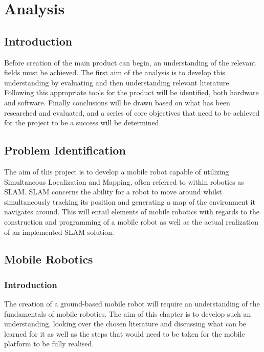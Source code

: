 \part{Analysis}
		\chapter{Introduction}
		Before creation of the main product can begin, an understanding of the relevant fields must be achieved. The first aim of the analysis is to develop this understanding by evaluating and then understanding relevant literature. Following this appropriate tools for the product will be identified, both hardware and software. Finally conclusions will be drawn based on what has been researched and evaluated, and a series of core objectives that need to be achieved for the project to be a success will be determined.

		\chapter{Problem Identification}
		The aim of this project is to develop a mobile robot capable of utilizing Simultaneous Localization and Mapping, often referred to within robotics as SLAM. SLAM concerns the ability for a robot to move around whilst simultaneously tracking its position and generating a map of the environment it navigates around. This will entail elements of mobile robotics with regards to the construction and programming of a mobile robot as well as the actual realization of an implemented SLAM solution.
		
		
		
		
		\chapter{Mobile Robotics}
		\label{litreview:mobilerobotics}
			\section{Introduction}
			The creation of a ground-based mobile robot will require an understanding of the fundamentals of mobile robotics. The aim of this chapter is to develop such an understanding, looking over the chosen literature and discussing what can be learned for it as well as the steps that would need to be taken for the mobile platform to be fully realised.
			
